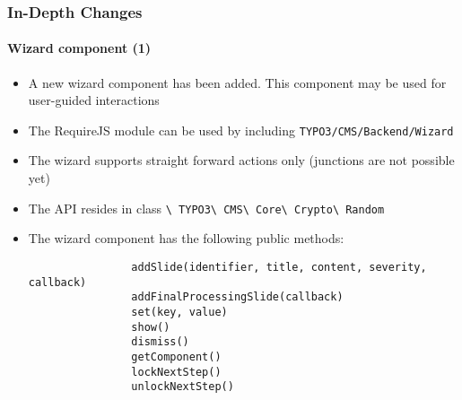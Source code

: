 \begin{frame}[fragile]
	\frametitle{In-Depth Changes}
	\framesubtitle{Wizard component (1)}

	\lstset{basicstyle=\tiny\ttfamily}

	\begin{itemize}

		\item A new wizard component has been added. This component may be used for user-guided interactions

		\item The RequireJS module can be used by including \texttt{TYPO3/CMS/Backend/Wizard}

		\item The wizard supports straight forward actions only\newline
			(junctions are not possible yet)

		\item The API resides in class
			\texttt{\textbackslash
				TYPO3\textbackslash
				CMS\textbackslash
				Core\textbackslash
				Crypto\textbackslash
				Random}

		\item The wizard component has the following public methods:

			\begin{lstlisting}
				addSlide(identifier, title, content, severity, callback)
				addFinalProcessingSlide(callback)
				set(key, value)
				show()
				dismiss()
				getComponent()
				lockNextStep()
				unlockNextStep()
			\end{lstlisting}

	\end{itemize}

\end{frame}

